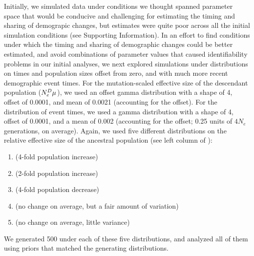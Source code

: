 
Initially, we simulated data under conditions we thought spanned parameter
space that would be conducive and challenging for estimating the timing and
sharing of demograpic changes, but estimates were quite poor across all the
initial simulation conditions (see Supporting Information).
In an effort to find conditions under which the timing and sharing of
demographic changes could be better estimated, and avoid combinations of
parameter values that caused identifiability problems in our initial
analyses,
we next explored simulations under distributions on times and population sizes
offset from zero, and with much more recent demographic event times.
For the mutation-scaled effective size of the descendant
population
($\epopsize[\descendantpopindex{}]\murate$),
we used an offset gamma distribution with a shape of 4, offset of 0.0001, and
mean of 0.0021 (accounting for the offset).
For the distribution of event times, we used a gamma distribution
with a shape of 4, offset of 0.0001, and a mean of 0.002 (accounting
for the offset; 0.25 units of $4N_e$ generations, on average).
Again, we used five different distributions on the relative effective size of
the ancestral population (see left column of
\figs
{}):
\begin{enumerate}[label=B.\arabic*]
    \item {} (4-fold population increase) \label{sims:optimalFourFoldIncrease}
    \item {} (2-fold population increase)  \label{sims:optimalTwoFoldIncrease}
    \item {} (4-fold population decrease)    \label{sims:optimalFourFoldDecrease}
    \item {} (no change on average, but a fair amount of variation) \label{sims:optimalCenter}
    \item {} (no change on average, little variance) \label{sims:optimalCenterNarrow}
\end{enumerate}
We generated 500 \datasets under each of these five distributions, and analyzed
all of them using priors that matched the generating distributions.

